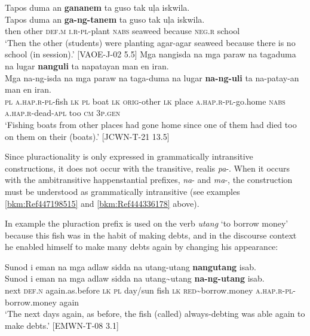 \newpage
\ea
\label{bkm:Ref444336178}
Tapos  duma  an  \textbf{gananem}  ta  guso  tak  uļa  iskwila. \\\smallskip
\gll Tapos  duma  an  \textbf{ga-ng-tanem}  ta  guso  tak  uļa  iskwila. \\
then  other  \textsc{def.m}  \textsc{i.r-pl}-plant  \textsc{nabs}  seaweed  because  \textsc{neg.r}  school \\
\glt ‘Then the other (students) were planting agar-agar seaweed because there is no school (in session).’ [VAOE-J-02 5.5]
\z
\ea
\label{bkm:Ref394988295}
Mga  nangisda  na  mga  paraw  na  tagaduma  na  lugar \textbf{nanguli}  ta  napatayan  man  en  iran. \\\smallskip
\gll Mga  na-ng-isda\footnotemark{}  na  mga  paraw  na  taga-duma  na  lugar \textbf{na-ng-uli}  ta  na-patay-an  man  en  iran. \\
\textsc{pl}  \textsc{a.hap.r-pl-}fish  \textsc{lk}  \textsc{pl}  boat  \textsc{lk}  \textsc{orig}-other  \textsc{lk}  place
\textsc{a.hap.r-pl-}go.home  \textsc{nabs}  \textsc{a.hap.r}-dead-\textsc{apl}  too  \textsc{cm}  3\textsc{p.gen} \\
\glt `Fishing boats from other places had gone home since one of them had died too on them on their (boats).’ [JCWN-T-21 13.5]
\z

Since pluractionality is only expressed in grammatically intransitive constructions, it does not occur with the transitive, realis \textit{pa}{}-. When it occurs with the ambitransitive happenstantial prefixes, \textit{na}{}- and \textit{ma}{}-, the construction must be understood as grammatically intransitive (see examples \ref{bkm:Ref447198515} and \ref{bkm:Ref444336178} above).

In example  the pluraction prefix is used on the verb \textit{utang} ‘to borrow money’ because this fish was in the habit of making debts, and in the discourse context he enabled himself to make many debts again by changing his appearance:

\ea
\label{bkm:Ref394988618}
Sunod  i  eman   na  mga  adlaw  sidda  na  utang-utang \textbf{nangutang}  isab. \\\smallskip
\gll Sunod  i  eman   na  mga  adlaw  sidda  na  utang\sim{}utang \textbf{na-ng-utang}  isab. \\
next  \textsc{def.n}  again.as.before  \textsc{lk} \textsc{pl}  day/sun  fish  \textsc{lk}  \textsc{red}\sim{}borrow.money \textsc{a.hap.r-pl}-borrow.money again \\
\glt `The next days again, as before, the fish (called) always-debting was able again to make debts.’ [EMWN-T-08 3.1]
\z

